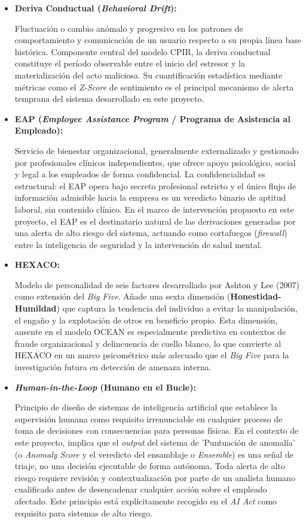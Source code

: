 \documentclass[IB]{TFUOC}%
\begin{document}
\begin{itemize}
    \item \textbf{Deriva Conductual (\textit{Behavioral Drift}):}
    
    Fluctuación o cambio anómalo y progresivo en los patrones de comportamiento y comunicación de un usuario respecto a su propia línea base histórica. Componente central del modelo CPIR, la deriva conductual constituye el período observable entre el inicio del estresor y la materialización del acto maliciosa. Su cuantificación estadística mediante métricas como el \textit{Z-Score} de sentimiento es el principal mecanismo de alerta temprana del sistema desarrollado en este proyecto.


    \item \textbf{EAP (\textit{Employee Assistance Program} / 
    Programa de Asistencia al Empleado):}
    
    Servicio de bienestar organizacional, generalmente externalizado y gestionado por profesionales clínicos independientes, que ofrece apoyo psicológico, social y legal a los empleados de forma confidencial. La confidencialidad es estructural: el EAP 
    opera bajo secreto profesional estricto y el único flujo de información admisible hacia la empresa es un veredicto binario de aptitud laboral, sin contenido clínico. En el marco de intervención propuesto en este proyecto, el EAP es el destinatario natural de las derivaciones generadas por una alerta de alto riesgo del sistema, actuando como cortafuegos (\textit{firewall}) entre la inteligencia de seguridad y la intervención de salud mental.

    \item \textbf{HEXACO:}
    
    Modelo de personalidad de seis factores desarrollado por Ashton y Lee (2007) como extensión del \textit{Big Five}. Añade una sexta dimensión (\textbf{Honestidad-Humildad}) que captura la tendencia del individuo a evitar la manipulación, el engaño y la explotación de otros en beneficio propio. Esta dimensión, ausente en el modelo OCEAN es especialmente predictiva en contextos de fraude organizacional y delincuencia de cuello blanco, lo que convierte al HEXACO en un marco psicométrico más adecuado que el \textit{Big Five} para la investigación futura en detección de amenaza interna.

    \item \textbf{\textit{Human-in-the-Loop} (Humano en el Bucle):}
    
    Principio de diseño de sistemas de inteligencia artificial que establece la supervisión humana como requisito irrenunciable en cualquier proceso de toma de decisiones con consecuencias para personas físicas. En el contexto de este proyecto, implica que el \textit{output} del sistema de 'Puntuación de anomalía' (o \textit{Anomaly Score} y el veredicto del ensamblaje o \textit{Ensemble}) es una señal de triaje, no una decisión ejecutable de forma autónoma. Toda alerta de alto riesgo requiere revisión y contextualización por parte de un analista humano cualificado antes de desencadenar cualquier acción sobre el empleado afectado. Este principio está explícitamente recogido en el \textit{AI Act} como requisito para sistemas de alto riesgo.



\end{itemize}
\end{document}
